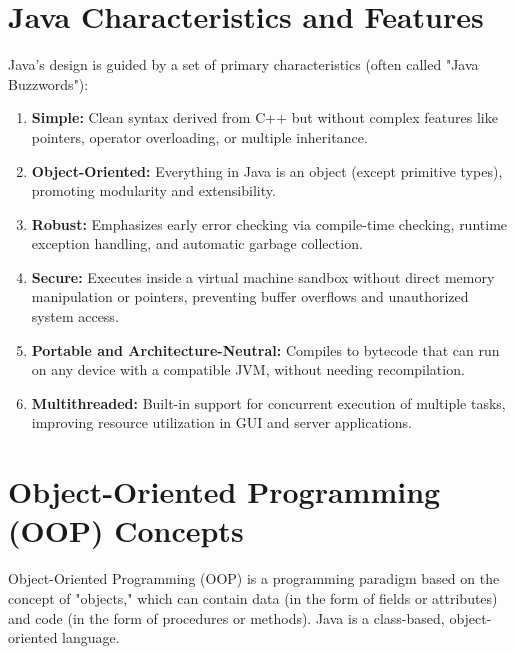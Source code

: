 \documentclass[12pt,a4paper]{article}
\begin{document}
\section{Java Characteristics and Features}

Java's design is guided by a set of primary characteristics (often called "Java Buzzwords"):

\begin{tcolorbox}[defbox, title={\textbf{Core Java Characteristics}}]
\begin{enumerate}[leftmargin=*, itemsep=3pt]
  \item \textbf{Simple:} Clean syntax derived from C++ but without complex features like pointers, operator overloading, or multiple inheritance.
  \item \textbf{Object-Oriented:} Everything in Java is an object (except primitive types), promoting modularity and extensibility.
  \item \textbf{Robust:} Emphasizes early error checking via compile-time checking, runtime exception handling, and automatic garbage collection.
  \item \textbf{Secure:} Executes inside a virtual machine sandbox without direct memory manipulation or pointers, preventing buffer overflows and unauthorized system access.
  \item \textbf{Portable and Architecture-Neutral:} Compiles to bytecode that can run on any device with a compatible JVM, without needing recompilation.
  \item \textbf{Multithreaded:} Built-in support for concurrent execution of multiple tasks, improving resource utilization in GUI and server applications.
\end{enumerate}
\end{tcolorbox}
\section{Object-Oriented Programming (OOP) Concepts}

Object-Oriented Programming (OOP) is a programming paradigm based on the concept of "objects," which can contain data (in the form of fields or attributes) and code (in the form of procedures or methods). Java is a class-based, object-oriented language.
\end{document}
